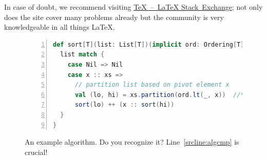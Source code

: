 \documentclass[]{rptuseminar}
\begin{document}
In case of doubt, we recommend visiting \href{http://tex.stackexchange.com}{TeX~--~LaTeX Stack~Exchange}; not only does the site cover many problems already but the community is very knowledgeable in all things \LaTeX{}.

\begin{figure}
\begin{lstlisting}[language=Scala,numbers=left]
def sort[T](list: List[T])(implicit ord: Ordering[T]): List[T] = {
  list match {
    case Nil => Nil
    case x :: xs =>
      // partition list based on pivot element x
      val (lo, hi) = xs.partition(ord.lt(_, x))  //*\label{srcline:algcmp}
      sort(lo) ++ (x :: sort(hi))
  }
}
\end{lstlisting}
\caption{An example algorithm. Do you recognize it? Line~\ref{srcline:algcmp} is crucial!}
\label{alg:example}
\end{figure}
\end{document}
